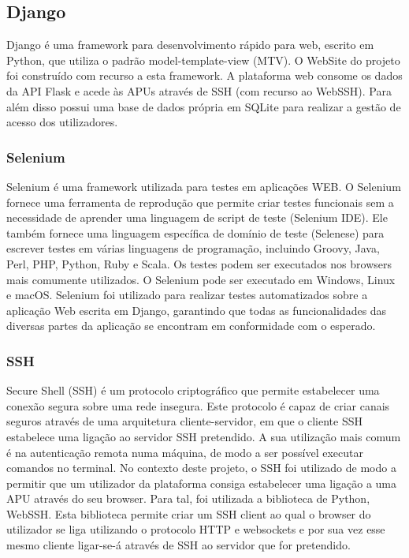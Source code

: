 \subsection{Django}
Django é uma framework para desenvolvimento rápido para web, escrito em Python, que utiliza o padrão model-template-view (MTV).\newline
O WebSite do projeto foi construído com recurso a esta framework. A plataforma web  consome os dados da API Flask e acede às APUs através de SSH (com recurso ao WebSSH). Para além disso possui uma  base de dados própria em SQLite para realizar a gestão de acesso dos utilizadores.


\subsubsection{Selenium}
Selenium é uma framework utilizada para testes em aplicações WEB. O Selenium fornece uma ferramenta de reprodução que permite criar testes funcionais sem a necessidade de aprender uma linguagem de script de teste (Selenium IDE). Ele também fornece uma linguagem específica de domínio de teste (Selenese) para escrever testes em várias linguagens de programação, incluindo Groovy, Java, Perl, PHP, Python, Ruby e Scala. Os testes podem ser executados nos browsers mais comumente utilizados. O Selenium pode ser executado em Windows, Linux e macOS.\newline
Selenium foi utilizado para realizar testes automatizados sobre a aplicação Web escrita em Django, garantindo que todas as funcionalidades das diversas partes da aplicação se encontram em conformidade com o esperado.

\subsubsection{SSH}
Secure Shell (SSH) é um protocolo criptográfico que permite estabelecer uma conexão segura sobre uma rede insegura. Este protocolo é capaz de criar canais seguros através de uma arquitetura cliente-servidor, em que o cliente SSH estabelece uma ligação ao servidor SSH pretendido. A sua utilização mais comum é na autenticação remota numa máquina, de modo a ser possível executar comandos no terminal.\newline
No contexto deste projeto, o SSH foi utilizado de modo a permitir que um utilizador da plataforma consiga estabelecer uma ligação a uma APU através do seu browser. Para tal, foi utilizada a biblioteca de Python, WebSSH.\newline
Esta biblioteca permite criar um SSH client ao qual o browser do utilizador se liga utilizando o protocolo HTTP e websockets e por sua vez esse mesmo cliente ligar-se-á através de SSH ao servidor que for pretendido.


